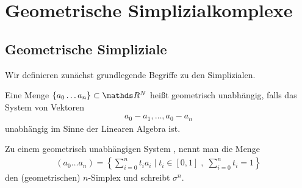 



% 
\section{Geometrische Simplizialkomplexe}

\subsection{Geometrische Simpliziale}


Wir definieren zunächst grundlegende Begriffe zu den Simplizialen.

\begin{Def}
  Eine Menge $\{ a_0\ldots a_n \} \subset \R^N$ heißt geometrisch
  unabhängig, falls das System von Vektoren
  \begin{gather*}
    a_0 - a_1 , \ldots , a_0 - a_n
  \end{gather*}
  unabhängig im Sinne der Linearen Algebra ist.
\end{Def}


\begin{Def}
  Zu einem geometrisch unabhängigen System \gs, nennt man die Menge
  \begin{gather*}
    (a_0 \ldots a_n) = \left\{ \sum\limits_{i=0}^n t_i a_i \; \Big|
      \; %
      t_i \in [0,1] \; , \; \sum\limits_{i=0}^n t_i = 1 \right\}
  \end{gather*}
  den (geometrischen) $n$-Simplex und schreibt $\sigma^n$.
\end{Def}


